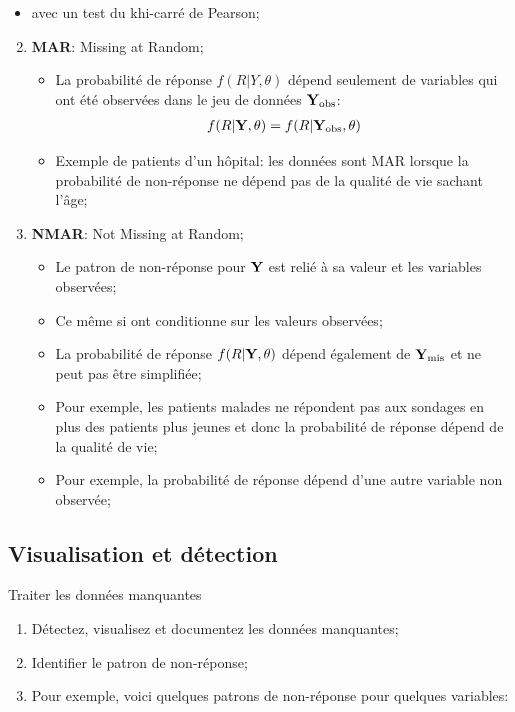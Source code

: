 \documentclass[10pt, french]{article}
\begin{document}
\begin{multicols*}{3}
\begin{enumerate}
\begin{itemize}
		\item[]	avec un test du khi-carré de Pearson;
		\end{itemize}	
\end{enumerate}
\begin{enumerate}
	\setcounter{enumi}{1}
	\item	\textbf{MAR}: Missing at Random;
		\begin{itemize}
		\item	La probabilité de réponse $f(R | Y, \theta)$ dépend seulement de variables qui ont été observées dans le jeu de données $\mathbf{Y}_{\text{obs}}$:
			\begin{align*}
			f(R | \mathbf{Y}, \theta) &= f(R | \mathbf{Y}_{\text{obs}}, \theta) \\
			\end{align*}
		\item	Exemple de patients d'un hôpital: les données sont MAR lorsque la probabilité de non-réponse ne dépend pas de la qualité de vie sachant l'âge;
		\end{itemize}
	\item	\textbf{NMAR}: Not Missing at Random;
		\begin{itemize}
		\item	Le patron de non-réponse pour $\mathbf{Y}$ est relié à sa valeur et les variables observées;
		\item[]	Ce même si ont conditionne sur les valeurs observées;
		\item	La probabilité de réponse $f(R | \mathbf{Y}, \theta)$ dépend également de $\mathbf{Y}_{\text{mis}}$ et ne peut pas être simplifiée;
		\item	Pour exemple, les patients malades ne répondent pas aux sondages en plus des patients plus jeunes et donc la probabilité de réponse dépend de la qualité de vie;
		\item	Pour exemple, la probabilité de réponse dépend d'une autre variable non observée;
		\end{itemize}
\end{enumerate}


\subsection*{Visualisation et détection}
\begin{algo}{Traiter les données manquantes}
\begin{enumerate}
	\item	Détectez, visualisez et documentez les données manquantes;
	\item	Identifier le patron de non-réponse;
	\item[]	Pour exemple, voici quelques patrons de non-réponse pour quelques variables:


\end{enumerate}
\end{algo}
\end{multicols*}
\end{document}
